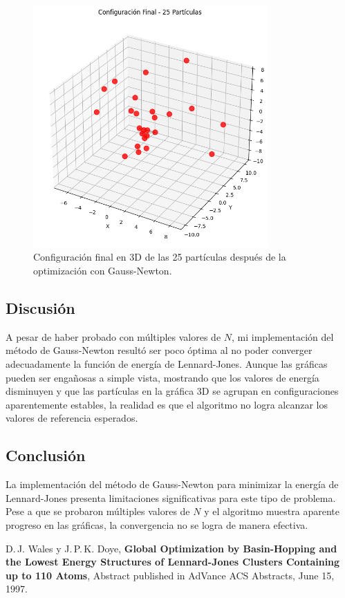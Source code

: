 \documentclass{article}
\begin{document}
\begin{figure}[H]
    \centering
    \includegraphics[width=0.8\textwidth]{images/9_configuracion_x.png}
    \caption{Configuración final en 3D de las 25 partículas después de la optimización con Gauss-Newton.}
\end{figure}

\subsection{Discusión}

A pesar de haber probado con múltiples valores de $N$, mi implementación del método de Gauss-Newton resultó ser poco óptima al no poder converger adecuadamente la función de energía de Lennard-Jones. Aunque las gráficas pueden ser engañosas a simple vista, mostrando que los valores de energía disminuyen y que las partículas en la gráfica 3D se agrupan en configuraciones aparentemente estables, la realidad es que el algoritmo no logra alcanzar los valores de referencia esperados.

\subsection{Conclusión}

La implementación del método de Gauss-Newton para minimizar la energía de Lennard-Jones presenta limitaciones significativas para este tipo de problema. Pese a que se probaron múltiples valores de $N$ y el algoritmo muestra aparente progreso en las gráficas, la convergencia no se logra de manera efectiva. 


\begin{thebibliography}{9}
D.\,J. Wales y J.\,P.\,K. Doye,
\textbf{Global Optimization by Basin-Hopping and the Lowest Energy Structures of Lennard-Jones Clusters Containing up to 110 Atoms}, Abstract published in AdVance ACS Abstracts, June 15, 1997.
\end{thebibliography}
\end{document}
